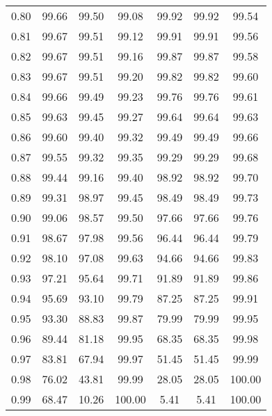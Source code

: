 \begin{tabular}{|c|c|c|c|c|c|c|}
      0.80 &     99.66 &     99.50 &      99.08 &   99.92 &      99.92 &         99.54 \\
      0.81 &     99.67 &     99.51 &      99.12 &   99.91 &      99.91 &         99.56 \\
      0.82 &     99.67 &     99.51 &      99.16 &   99.87 &      99.87 &         99.58 \\
      0.83 &     99.67 &     99.51 &      99.20 &   99.82 &      99.82 &         99.60 \\
      0.84 &     99.66 &     99.49 &      99.23 &   99.76 &      99.76 &         99.61 \\
      0.85 &     99.63 &     99.45 &      99.27 &   99.64 &      99.64 &         99.63 \\
      0.86 &     99.60 &     99.40 &      99.32 &   99.49 &      99.49 &         99.66 \\
      0.87 &     99.55 &     99.32 &      99.35 &   99.29 &      99.29 &         99.68 \\
      0.88 &     99.44 &     99.16 &      99.40 &   98.92 &      98.92 &         99.70 \\
      0.89 &     99.31 &     98.97 &      99.45 &   98.49 &      98.49 &         99.73 \\
      0.90 &     99.06 &     98.57 &      99.50 &   97.66 &      97.66 &         99.76 \\
      0.91 &     98.67 &     97.98 &      99.56 &   96.44 &      96.44 &         99.79 \\
      0.92 &     98.10 &     97.08 &      99.63 &   94.66 &      94.66 &         99.83 \\
      0.93 &     97.21 &     95.64 &      99.71 &   91.89 &      91.89 &         99.86 \\
      0.94 &     95.69 &     93.10 &      99.79 &   87.25 &      87.25 &         99.91 \\
      0.95 &     93.30 &     88.83 &      99.87 &   79.99 &      79.99 &         99.95 \\
      0.96 &     89.44 &     81.18 &      99.95 &   68.35 &      68.35 &         99.98 \\
      0.97 &     83.81 &     67.94 &      99.97 &   51.45 &      51.45 &         99.99 \\
      0.98 &     76.02 &     43.81 &      99.99 &   28.05 &      28.05 &        100.00 \\
      0.99 &     68.47 &     10.26 &     100.00 &    5.41 &       5.41 &        100.00 \\
\bottomrule
\end{tabular}

